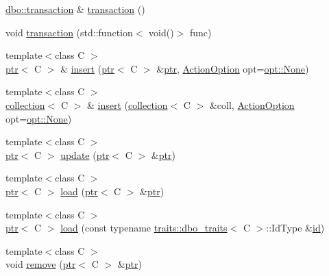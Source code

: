 \begin{DoxyCompactItemize}
\hyperlink{classdbo_1_1transaction}{dbo\+::transaction} \& \hyperlink{classdbo_1_1connection_a9e5653a2fc346acae23be6c3fd64e6aa}{transaction} ()
\item 
void \hyperlink{classdbo_1_1connection_a4ca7a503bc8fc3373ac2e49ea9c53f8f}{transaction} (std\+::function$<$ void()$>$ func)
\item 
{\footnotesize template$<$class C $>$ }\\\hyperlink{classdbo_1_1ptr}{ptr}$<$ C $>$ \& \hyperlink{classdbo_1_1connection_a9aee3a878ec49c35c6c51caf608a830f}{insert} (\hyperlink{classdbo_1_1ptr}{ptr}$<$ C $>$ \&\hyperlink{classdbo_1_1ptr}{ptr}, \hyperlink{classdbo_1_1_action_option}{Action\+Option} opt=\hyperlink{namespacedbo_1_1opt_ab4b7820471aaf46d67dffc2ee8b91dc4}{opt\+::\+None})
\item 
{\footnotesize template$<$class C $>$ }\\\hyperlink{classdbo_1_1collection}{collection}$<$ C $>$ \& \hyperlink{classdbo_1_1connection_ad89a1897d616931d30d9fd8d1258a9ca}{insert} (\hyperlink{classdbo_1_1collection}{collection}$<$ C $>$ \&coll, \hyperlink{classdbo_1_1_action_option}{Action\+Option} opt=\hyperlink{namespacedbo_1_1opt_ab4b7820471aaf46d67dffc2ee8b91dc4}{opt\+::\+None})
\item 
{\footnotesize template$<$class C $>$ }\\\hyperlink{classdbo_1_1ptr}{ptr}$<$ C $>$ \hyperlink{classdbo_1_1connection_a715d6c6defb04ba52aa09b630a0690a0}{update} (\hyperlink{classdbo_1_1ptr}{ptr}$<$ C $>$ \&\hyperlink{classdbo_1_1ptr}{ptr})
\item 
{\footnotesize template$<$class C $>$ }\\\hyperlink{classdbo_1_1ptr}{ptr}$<$ C $>$ \hyperlink{classdbo_1_1connection_a2543fa651e2588cc33c8609006ea9f75}{load} (\hyperlink{classdbo_1_1ptr}{ptr}$<$ C $>$ \&\hyperlink{classdbo_1_1ptr}{ptr})
\item 
{\footnotesize template$<$class C $>$ }\\\hyperlink{classdbo_1_1ptr}{ptr}$<$ C $>$ \hyperlink{classdbo_1_1connection_a877e459a53832d28340a58b41faafe38}{load} (const typename \hyperlink{structdbo_1_1traits_1_1dbo__traits}{traits\+::dbo\+\_\+traits}$<$ C $>$\+::Id\+Type \&\hyperlink{namespacedbo_a8d25907296ae8360b3120b7492022c1d}{id})
\item 
{\footnotesize template$<$class C $>$ }\\void \hyperlink{classdbo_1_1connection_a6943a85362796da5b6a054e680817d34}{remove} (\hyperlink{classdbo_1_1ptr}{ptr}$<$ C $>$ \&\hyperlink{classdbo_1_1ptr}{ptr})

\end{DoxyCompactItemize}

